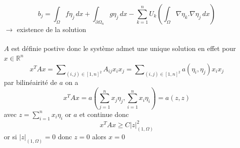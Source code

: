 \documentclass{article}
\begin{document}
$$
b_j = \int_{\Omega} f \eta_j \,dx + \int_{\partial \Omega_{n}} g \eta_j \,dx - \sum_{k=1}^{n} U_k (\int_{\Omega} \nabla \eta_k . \nabla \eta_j \,dx)
$$
$\rightarrow$ existence de la solution \\ \\
$A$ est définie postive donc le système admet une unique solution en effet pour $x \in \mathbb{R}^n$
$$
x^{T}Ax = \sum\nolimits_{(i, j) \in [1, n]^2} A_{ij} x_i x_j = \sum\nolimits_{(i, j) \in [1, n]^2} a(\eta_i, \eta_j) x_i x_j
$$
par bilinéairité de $a$ on a
$$
x^{T}Ax = a(\sum_{j=1}^{n} x_j \eta_j, \sum_{i=1}^{n} x_i \eta_i) = a(z, z)
$$
avec $z = \sum_{i=1}^{n} x_i \eta_i$ or $a$ et continue donc 
$$
x^{T}Ax \geq C |z|^{2}_{(1, \Omega)}
$$
or si $|z|_{(1, \Omega)} = 0$ donc $z = 0$ alors $x=0$
\end{document}
